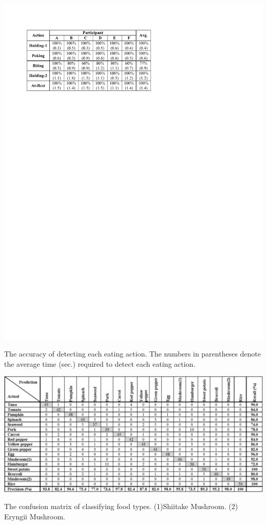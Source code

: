 \begin{table}[t]
\begin{center}
\includegraphics[width=14cm]{image/tables01.pdf}
\caption{The accuracy of detecting each eating action. The numbers in parentheses denote the average time (sec.) required to detect each eating action.}
\label{table1}
\end{center}
\end{table}

\begin{table}[t]
\centering
\includegraphics[width=15cm]{image/table2.ps}
\caption{The confusion matrix of classifying food types. (1)Shiitake Mushroom.  (2) Eryngii Mushroom.}
\label{table2}
\end{table}


